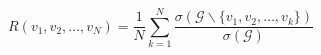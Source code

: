 \begin{equation}
    R(v_1, v_2, \ldots, v_N)=\frac{1}{N}\sum_{k=1}^N\frac{\sigma(\mathcal{G} \backslash \{ v_1,v_2, \ldots, v_k \})}{\sigma (\mathcal{G})}
    \label{formula:无拆除代价的ANC}
\end{equation}